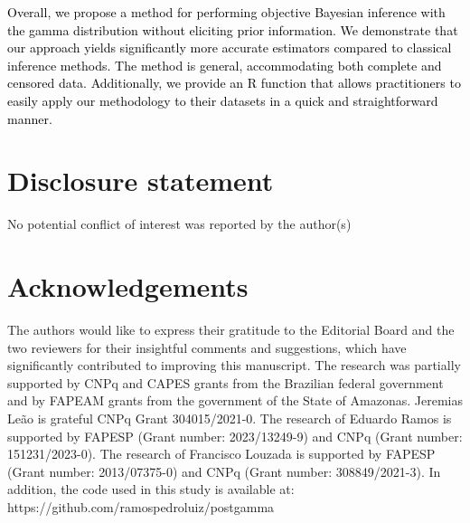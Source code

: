 \documentclass[]{interact}
\theoremstyle{plain}%
\theoremstyle{definition}
\theoremstyle{remark}
\begin{document}
\textcolor{black}{Overall, we propose a method for performing objective Bayesian inference with the gamma distribution without eliciting prior information. We demonstrate that our approach yields significantly more accurate estimators compared to classical inference methods. The method is general, accommodating both complete and censored data. Additionally, we provide an R function that allows practitioners to easily apply our methodology to their datasets in a quick and straightforward manner.}

\section*{Disclosure statement}

No potential conflict of interest was reported by the author(s)


\section*{Acknowledgements}

The authors would like to express their gratitude to the Editorial Board and the two reviewers for their insightful comments and suggestions, which have significantly contributed to improving this manuscript. The research was partially supported by CNPq and CAPES grants from the Brazilian federal government and by FAPEAM grants from the government of the State of Amazonas. Jeremias Leão 
is grateful CNPq Grant 304015/2021-0.  The research of 
 Eduardo Ramos is supported by FAPESP
(Grant number: 2023/13249-9) and CNPq (Grant number:  151231/2023-0). The research of Francisco Louzada is supported by FAPESP (Grant number: 2013/07375-0) and CNPq (Grant number: 308849/2021-3). In addition, the code used in this study is available at: https://github.com/ramospedroluiz/postgamma

\begin{appendix}    



\end{appendix}



\end{document}
